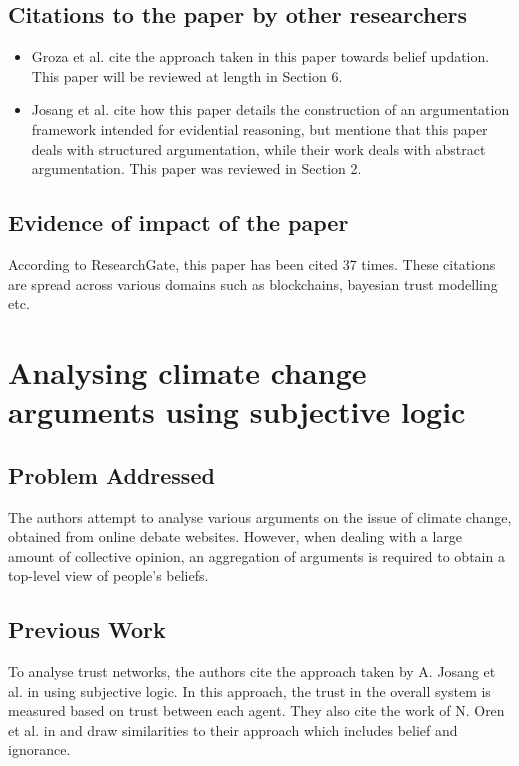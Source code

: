 \documentclass[UTF8]{article}
\begin{document}
\subsection{Citations to the paper by other researchers}
\begin{itemize}
  \item Groza et al. \cite{8516616} cite the approach taken in this paper towards belief updation. This paper will be reviewed at length in Section 6.
  \item Josang et al. \cite{8455455} cite how this paper details the construction of an argumentation framework intended for evidential reasoning, but mentione that this paper deals with structured argumentation, while their work deals with abstract argumentation. This paper was reviewed in Section 2.
\end{itemize}

\subsection{Evidence of impact of the paper}
According to ResearchGate, this paper has been cited 37 times. These citations are spread across various domains such as blockchains, bayesian trust modelling etc.  

\section{Analysing climate change arguments using subjective logic}
\subsection{Problem Addressed}
The authors attempt to analyse various arguments on the issue of climate change, obtained from online debate websites. However, when dealing with a large amount of 
collective opinion, an aggregation of arguments is required to obtain a top-level view of people's beliefs.
\subsection{Previous Work}
To analyse trust networks, the authors cite the approach taken by A. Josang et al. in \cite{Jsang2006TrustNA} using subjective logic. In this approach, the trust in the overall system 
is measured based on trust between each agent. They also cite the work of N. Oren et al. in \cite{OREN2007838} and draw similarities to their approach which includes belief and ignorance. 
\end{document}
